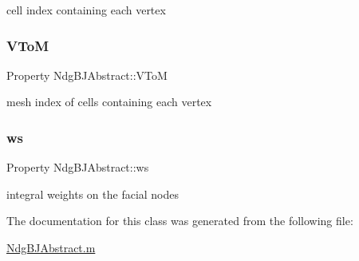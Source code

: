 cell index containing each vertex 

\mbox{\label{class_ndg_b_j_abstract_a8f549dce5b788e8b7552e134bdcd3c4e}} 
\subsubsection{\texorpdfstring{V\+ToM}{VToM}}
{\footnotesize\ttfamily Property Ndg\+B\+J\+Abstract\+::\+V\+ToM}



mesh index of cells containing each vertex 

\mbox{\label{class_ndg_b_j_abstract_ac5f3dac034e7861f44ed9627279970c4}} 
\subsubsection{\texorpdfstring{ws}{ws}}
{\footnotesize\ttfamily Property Ndg\+B\+J\+Abstract\+::ws}



integral weights on the facial nodes 



The documentation for this class was generated from the following file\+:\begin{DoxyCompactItemize}
\item 
\hyperlink{_ndg_b_j_abstract_8m}{Ndg\+B\+J\+Abstract.\+m}\end{DoxyCompactItemize}

